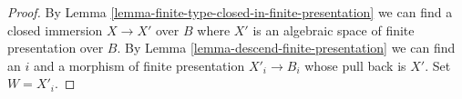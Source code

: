 \documentclass{stacks-project}
\theoremstyle{plain}
\theoremstyle{definition}
\theoremstyle{remark}
\numberwithin{equation}{subsection}
\begin{document}
\begin{proof}
By Lemma \ref{lemma-finite-type-closed-in-finite-presentation}
we can find a closed immersion $X \to X'$
over $B$ where $X'$ is an algebraic space of finite presentation over $B$.
By Lemma \ref{lemma-descend-finite-presentation}
we can find an $i$ and a morphism of finite presentation
$X'_i \to B_i$ whose pull back is $X'$. Set $W = X'_i$.
\end{proof}
\end{document}
